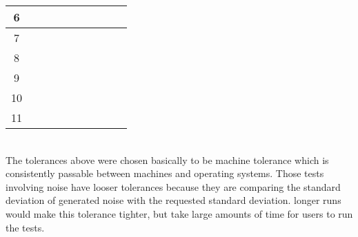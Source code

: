 \begin{table}[htbp]
\begin{tabular}{ c | c | c | c | c | c | c | c | c | c }
		6 & &&&&&&&&	   \\ \hline
		7    & &&&&&&&&	   \\ \hline
		8	& &&&&&&&&	   \\ \hline
		9	& &&&&&&&&	   \\ \hline
		10	& &&&&&&&&	   \\ \hline
		11    & &&&&&&&&	   \\ \hline
		\hline
	\end{tabular}
\end{table}
%
\\The tolerances above were chosen basically to be machine tolerance which is consistently passable between machines and operating systems. Those tests involving noise have looser tolerances because they are comparing the standard deviation of generated noise with the requested standard deviation. longer runs would make this tolerance tighter, but take large amounts of time for users to run the tests.

